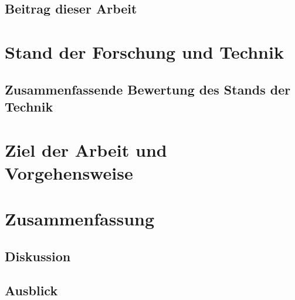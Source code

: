 \documentclass[%
english, ngerman,%
twoside, %
toc=bib,
]{isw_smb_diss} %
\numberwithin{equation}{chapter} %
\begin{document}
\section{Beitrag dieser Arbeit}

\chapter{Stand der Forschung und Technik}
\section{Zusammenfassende Bewertung des Stands der Technik}

\chapter{Ziel der Arbeit und Vorgehensweise}



\chapter{Zusammenfassung}
\section{Diskussion}
\section{Ausblick}

\nocite{*}

\setlength{\emergencystretch}{.5em}
\printbibliography[title={Literatur}]





\cleardoublepage
\appendix
\renewcommand{\thesection}{\Alph{section}} %
\renewcommand\thefigure{\thesection\arabic{figure}}
\renewcommand\thetable{\thesection\arabic{table}}
\end{document}
